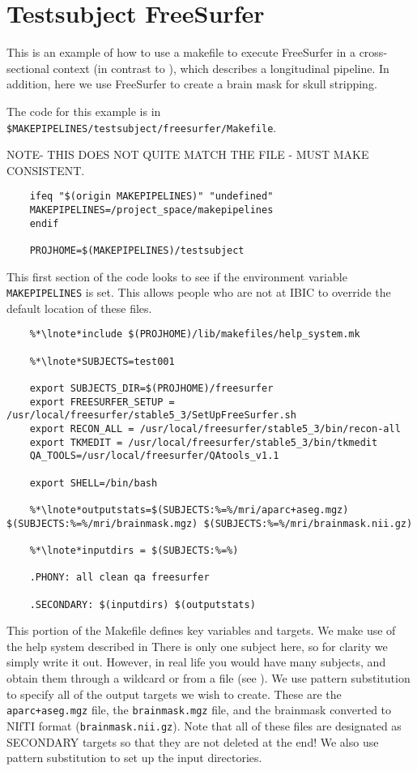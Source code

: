 \section{Testsubject FreeSurfer}
\label{example:freesurfer}

This is an example of how to use a makefile to execute FreeSurfer in a
cross-sectional context (in contrast to
), which describes a longitudinal pipeline.  In addition, here we use FreeSurfer to
create a brain mask for skull stripping.

The code for this example is in \texttt{\$MAKEPIPELINES/testsubject/freesurfer/Makefile}.

NOTE- THIS DOES NOT QUITE MATCH THE FILE - MUST MAKE CONSISTENT.

\setcounter{codehighlight}{0} %

\begin{lstlisting}
	ifeq "$(origin MAKEPIPELINES)" "undefined"
	MAKEPIPELINES=/project_space/makepipelines
	endif

	PROJHOME=$(MAKEPIPELINES)/testsubject 
\end{lstlisting}

This first section of the code looks to see if the environment variable
\texttt{MAKEPIPELINES} is set. This allows people who are not at IBIC
to override the default location of these files.

\begin{lstlisting}
	%*\lnote*include $(PROJHOME)/lib/makefiles/help_system.mk 

	%*\lnote*SUBJECTS=test001 

	export SUBJECTS_DIR=$(PROJHOME)/freesurfer 
	export FREESURFER_SETUP = /usr/local/freesurfer/stable5_3/SetUpFreeSurfer.sh 
	export RECON_ALL = /usr/local/freesurfer/stable5_3/bin/recon-all 
	export TKMEDIT = /usr/local/freesurfer/stable5_3/bin/tkmedit 
	QA_TOOLS=/usr/local/freesurfer/QAtools_v1.1 

	export SHELL=/bin/bash

	%*\lnote*outputstats=$(SUBJECTS:%=%/mri/aparc+aseg.mgz) $(SUBJECTS:%=%/mri/brainmask.mgz) $(SUBJECTS:%=%/mri/brainmask.nii.gz)

	%*\lnote*inputdirs = $(SUBJECTS:%=%)

	.PHONY: all clean qa freesurfer

	.SECONDARY: $(inputdirs) $(outputstats)
\end{lstlisting}

This portion of the Makefile defines key variables and targets. 
 We make use of the help system described in
 There is only one subject here, so for clarity we simply
write it out. However, in real life you would have many subjects, and
obtain them through a wildcard or from a file (see
).
 We use pattern substitution to specify all of the output
targets we wish to create. These are the \texttt{aparc+aseg.mgz} file,
the \texttt{brainmask.mgz} file, and the brainmask converted to NIfTI
format (\texttt{brainmask.nii.gz}). Note that all of these files are
designated as SECONDARY targets so that they are not deleted at the end!
 We also use pattern substitution to set up the input directories.



